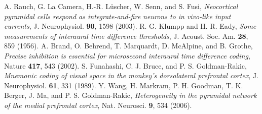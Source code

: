  A. Rauch, G. La Camera, H.-R. L\"uscher, W. Senn, and S. Fusi, \emph{Neocortical pyramidal cells respond as integrate-and-fire neurons to in vivo-like input currents}, J. Neurophysiol. \textbf{90}, 1598 (2003).
 R. G. Klumpp and H. R. Eady, \emph{Some measurements of interaural time difference thresholds}, J. Acoust. Soc. Am. \textbf{28}, 859 (1956).
 A. Brand, O. Behrend, T. Marquardt, D. McAlpine, and B. Grothe, \emph{Precise inhibition is essential for microsecond interaural time difference coding}, Nature \textbf{417}, 543 (2002).
 S. Funahashi, C. J. Bruce, and P. S. Goldman-Rakic, \emph{Mnemonic coding of visual space in the monkey's dorsolateral prefrontal cortex}, J. Neurophysiol. \textbf{61}, 331 (1989).
 Y. Wang, H. Markram, P. H. Goodman, T. K. Berger, J. Ma, and P. S. Goldman-Rakic, \emph{Heterogeneity in the pyramidal network of the medial prefrontal cortex}, Nat. Neurosci. \textbf{9}, 534 (2006).
